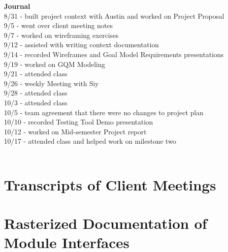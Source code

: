 \documentclass[oneside,openany,obeyspaces]{book}
\begin{document}
\begin{flushleft}
    \textbf{Journal\\}
    8/31 - built project context with Austin and worked on Project Proposal\\
    9/5 - went over client meeting notes\\
    9/7 - worked on wireframing exercises\\
    9/12 - assisted with writing context documentation\\
    9/14 - recorded Wireframes and Goal Model Requirements presentations\\
    9/19 - worked on GQM Modeling\\
    9/21 - attended class\\
    9/26 - weekly Meeting with Siy\\
    9/28 - attended class\\
    10/3 - attended class\\
    10/5 - team agreement that there were no changes to project plan\\
    10/10 - recorded Testing Tool Demo presentation\\
    10/12 - worked on Mid-semester Project report\\
    10/17 - attended class and helped work on milestone two\\~\\


    \section{Transcripts of Client Meetings}


    


    

    \section{Rasterized Documentation of Module Interfaces}


\end{flushleft}
\end{document}
